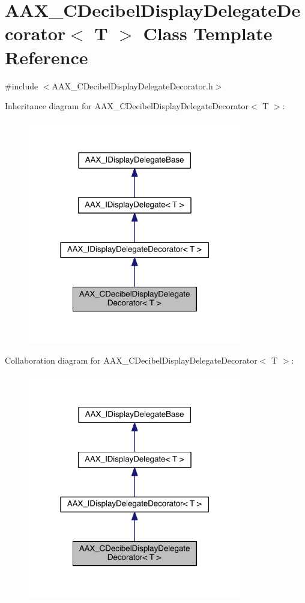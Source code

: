 \hypertarget{a00015}{}\section{A\+A\+X\+\_\+\+C\+Decibel\+Display\+Delegate\+Decorator$<$ T $>$ Class Template Reference}
\label{a00015}


{\ttfamily \#include $<$A\+A\+X\+\_\+\+C\+Decibel\+Display\+Delegate\+Decorator.\+h$>$}



Inheritance diagram for A\+A\+X\+\_\+\+C\+Decibel\+Display\+Delegate\+Decorator$<$ T $>$\+:
\nopagebreak
\begin{figure}[H]
\begin{center}
\leavevmode
\includegraphics[width=265pt]{a00408}
\end{center}
\end{figure}


Collaboration diagram for A\+A\+X\+\_\+\+C\+Decibel\+Display\+Delegate\+Decorator$<$ T $>$\+:
\nopagebreak
\begin{figure}[H]
\begin{center}
\leavevmode
\includegraphics[width=265pt]{a00409}
\end{center}
\end{figure}


